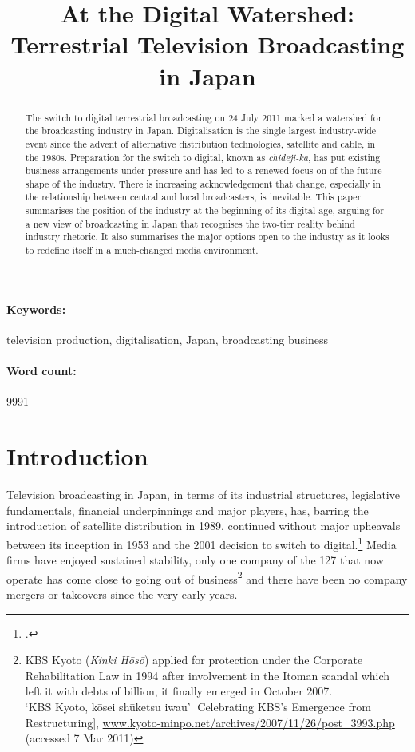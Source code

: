 \documentclass[11pt, oneside, a4paper, headsepline]{scrartcl}
\title{At the Digital Watershed: Terrestrial Television Broadcasting in Japan}
\author{}
\date{}
\newcommand{\citej}[2] {\footcite[\nopp #1]{#2} }
\newcommand{\cjk}[1]{{\fontspec[Scale=0.9]{Hiragino Mincho Pro}#1}}
\newcommand{\ty}{\textyen}
\begin{document}

\maketitle
\begin{abstract}%
The switch to digital terrestrial broadcasting on 24 July 2011 marked a watershed for the broadcasting industry in Japan. Digitalisation is the single largest industry-wide event since the advent of alternative distribution technologies, satellite and cable, in the 1980s. Preparation for the switch to digital, known as \emph{chideji-ka}, has put existing business arrangements under pressure and has led to a renewed focus on of the future shape of the industry. There is increasing acknowledgement that change, especially in the relationship between central and local broadcasters, is inevitable. This paper summarises the position of the industry at the beginning of its digital age, arguing for a new view of broadcasting in Japan that recognises the two-tier reality behind industry rhetoric. It also summarises the major options open to the industry as it looks to redefine itself in a much-changed media environment.
\end{abstract}
\paragraph*{Keywords:} television production, digitalisation, Japan, broadcasting business
\paragraph*{Word count:} 9991
\thispagestyle{empty}
\clearpage


\setlength{\parindent}{1em}
\setcounter{page}{1}
\section{Introduction}\label{Introduction}
Television broadcasting in Japan, in terms of its industrial structures, legislative fundamentals, financial underpinnings and major players, has, barring the introduction of satellite distribution in 1989, continued without major upheavals between its inception in 1953 and the 2001 decision to switch to digital.\citej{63}{Kwak:2008} Media firms have enjoyed sustained stability, only one company of the 127 that now operate has come close to going out of business\footnote{KBS Kyoto (\textit{Kinki H\={o}s\={o}}) applied for protection under the Corporate Rehabilitation Law in 1994 after involvement in the Itoman scandal which left it with debts of \ty11.5 billion, it finally emerged in October 2007.\\
`KBS Kyoto, k\={o}sei sh\={u}ketsu iwau' [Celebrating KBS's Emergence from Restructuring], \url{www.kyoto-minpo.net/archives/2007/11/26/post_3993.php} (accessed 7 Mar 2011)} and there have been no company mergers or takeovers since the very early years. 
\end{document}
